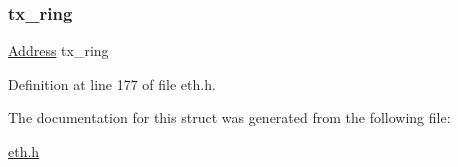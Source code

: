 \subsubsection{\texorpdfstring{tx\+\_\+ring}{tx\_ring}}
{\footnotesize\ttfamily \hyperlink{tap_8h_a40606a38de2ce007717541a358bab07b}{Address} tx\+\_\+ring}



Definition at line 177 of file eth.\+h.



The documentation for this struct was generated from the following file\+:\begin{DoxyCompactItemize}
\item 
\hyperlink{eth_8h}{eth.\+h}\end{DoxyCompactItemize}

